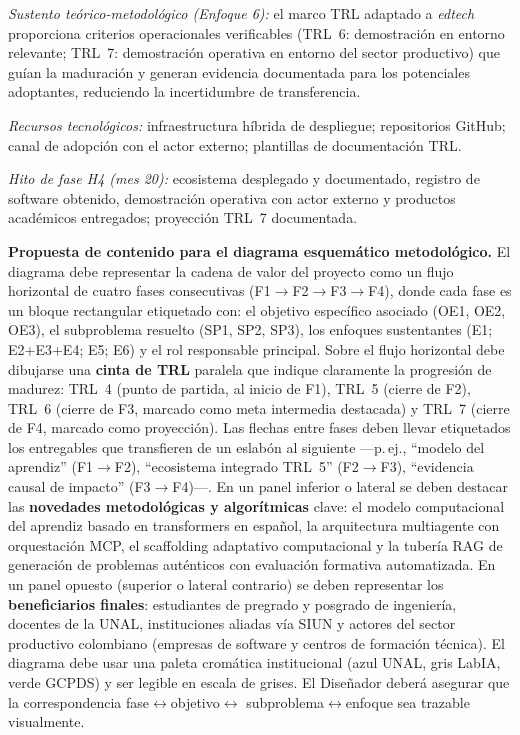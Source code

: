 \emph{Sustento teórico-metodológico (Enfoque 6):} el marco TRL adaptado a
\emph{edtech} proporciona criterios operacionales verificables (TRL~6:
demostración en entorno relevante; TRL~7: demostración operativa en entorno del
sector productivo) que guían la maduración y generan evidencia documentada para
los potenciales adoptantes, reduciendo la incertidumbre de transferencia.

\emph{Recursos tecnológicos:} infraestructura híbrida de despliegue; repositorios
GitHub; canal de adopción con el actor externo; plantillas de documentación TRL.

\emph{Hito de fase H4 (mes 20):} ecosistema desplegado y documentado, registro de
software obtenido, demostración operativa con actor externo y productos
académicos entregados; proyección TRL~7 documentada.

\medskip


\noindent\textbf{Propuesta de contenido para el diagrama esquemático metodológico.}
El diagrama debe representar la cadena de valor del proyecto como un flujo
horizontal de cuatro fases consecutivas (F1$\to$F2$\to$F3$\to$F4), donde cada
fase es un bloque rectangular etiquetado con: el objetivo específico asociado
(OE1, OE2, OE3), el subproblema resuelto (SP1, SP2, SP3), los enfoques
sustentantes (E1; E2+E3+E4; E5; E6) y el rol responsable principal.
Sobre el flujo horizontal debe dibujarse una \textbf{cinta de TRL} paralela
que indique claramente la progresión de madurez: TRL~4 (punto de partida, al
inicio de F1), TRL~5 (cierre de F2), TRL~6 (cierre de F3, marcado como meta
intermedia destacada) y TRL~7 (cierre de F4, marcado como proyección). Las
flechas entre fases deben llevar etiquetados los entregables que transfieren de
un eslabón al siguiente —p.\,ej., ``modelo del aprendiz'' (F1$\to$F2),
``ecosistema integrado TRL~5'' (F2$\to$F3), ``evidencia causal de impacto''
(F3$\to$F4)—. En un panel inferior o lateral se deben destacar las
\textbf{novedades metodológicas y algorítmicas} clave: el modelo computacional
del aprendiz basado en transformers en español, la arquitectura multiagente con
orquestación MCP, el scaffolding adaptativo computacional y la tubería RAG de
generación de problemas auténticos con evaluación formativa automatizada. En un
panel opuesto (superior o lateral contrario) se deben representar los
\textbf{beneficiarios finales}: estudiantes de pregrado y posgrado de
ingeniería, docentes de la UNAL, instituciones aliadas vía SIUN y actores del
sector productivo colombiano (empresas de software y centros de formación
técnica). El diagrama debe usar una paleta cromática institucional (azul UNAL,
gris LabIA, verde GCPDS) y ser legible en escala de grises. El Diseñador deberá
asegurar que la correspondencia fase$\leftrightarrow$objetivo$\leftrightarrow$
subproblema$\leftrightarrow$enfoque sea trazable visualmente.
